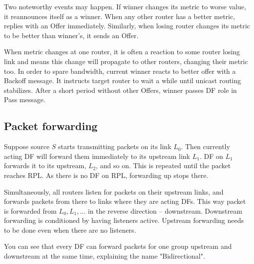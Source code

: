 Two noteworthy events may happen. If winner changes its metric to worse value,
it reannounces itself as a winner. When any other router has a better metric,
replies with an Offer immediately. Similarly, when losing router changes its
metric to be better than winner's, it sends an Offer.

When metric changes at one router, it is often a reaction to some router losing
link and means this change will propagate to other routers, changing their
metric too. In order to spare bandwidth, current winner reacts to better offer
with a Backoff message. It instructs target router to wait a while until
unicast routing stabilizes. After a short period without other Offers, winner
passes DF role in Pass message.


\subsection{Packet forwarding}

Suppose source $S$ starts transmitting packets on its link $L_0$. Then
currently acting DF will forward them immediately to its upstream link $L_1$.
DF on $L_1$ forwards it to its upstream, $L_2$, and so on. This is repeated
until the packet reaches RPL. As there is no DF on RPL, forwarding up stops
there.

Simultaneously, all routers listen for packets on their upstream links, and
forwards packets from there to links where they are acting DFs. This way packet
is forwarded from $L_0, L_1, \dots$ in the reverse direction -- downstream.
Downstream forwarding is conditioned by having listeners active. Upstream
forwarding needs to be done even when there are no listeners.

You can see that every DF can forward packets for one group upstream and
downstream at the same time, explaining the name "Bidirectional".

